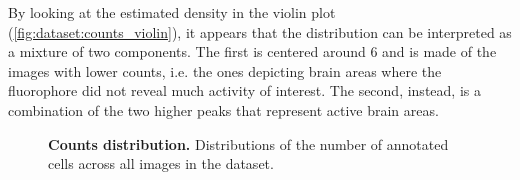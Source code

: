 By looking at the estimated density in the violin plot (\cref{fig:dataset:counts_violin}), it appears that the distribution can be interpreted as a mixture of two components.
The first is centered around 6 and is made of the images with lower counts, i.e. the ones depicting brain areas where the fluorophore did not reveal much activity of interest.
The second, instead, is a combination of the two higher peaks that represent active brain areas.
\begin{figure}
    \centering
    \caption{\textbf{Counts distribution.} Distributions of the number of annotated cells across all images in the dataset.}
    \label{fig:dataset:counts_distrib}
\end{figure}